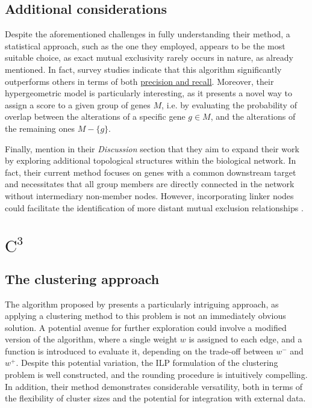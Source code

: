\subsection{Additional considerations}

Despite the aforementioned challenges in fully understanding their method, a statistical approach, such as the one they employed, appears to be the most suitable choice, as exact mutual exclusivity rarely occurs in nature, as already mentioned. In fact, survey studies \cite{survey} indicate that this algorithm significantly outperforms others in terms of both \href{https://en.wikipedia.org/wiki/Precision_and_recall}{precision and recall}. Moreover, their hypergeometric model is particularly interesting, as it presents a novel way to assign a score to a given group of genes $M$, i.e. by evaluating the probability of overlap between the alterations of a specific gene $g \in M$, and the alterations of the remaining ones $M-\{g\}$.

Finally, \textcite{mutex} mention in their \textit{Discussion} section that they aim to expand their work by exploring additional topological structures within the biological network. In fact, their current method focuses on genes with a common downstream target and necessitates that all group members are directly connected in the network without intermediary non-member nodes. However, incorporating linker nodes could facilitate the identification of more distant mutual exclusion relationships \cite{mutex}.

\section{$\mathrm{C}^3$}

\subsection{The clustering approach}

The algorithm proposed by \textcite{c3} presents a particularly intriguing approach, as applying a clustering method to this problem is not an immediately obvious solution. A potential avenue for further exploration could involve a modified version of the algorithm, where a single weight $w$ is assigned to each edge, and a function is introduced to evaluate it, depending on the trade-off between $w^-$ and $w^+$. Despite this potential variation, the ILP formulation of the clustering problem is well constructed, and the rounding procedure is intuitively compelling. In addition, their method demonstrates considerable versatility, both in terms of the flexibility of cluster sizes and the potential for integration with external data.

